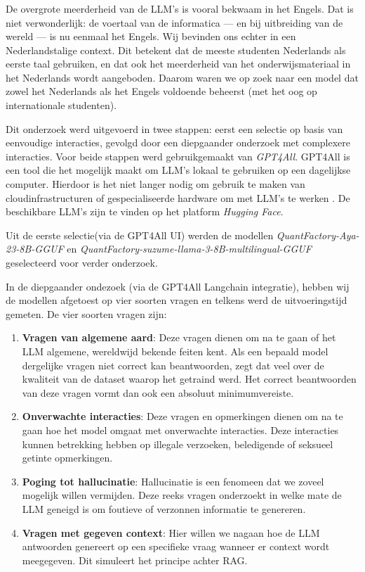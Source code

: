 \subsubsection{}%
\label{subsubsec:LLM-ontdekking}

De overgrote meerderheid van de \acrshort{LLM}'s is vooral bekwaam in het Engels. Dat is niet verwonderlijk: de voertaal van de informatica — en bij uitbreiding van de wereld — is nu eenmaal het Engels. Wij bevinden ons echter in een Nederlandstalige context. Dit betekent dat de meeste studenten Nederlands als eerste taal gebruiken, en dat ook het meerderheid van het onderwijsmateriaal in het Nederlands wordt aangeboden. Daarom waren we op zoek naar een model dat zowel het Nederlands als het Engels voldoende beheerst (met het oog op internationale studenten).

Dit onderzoek werd uitgevoerd in twee stappen: eerst een selectie op basis van eenvoudige interacties, gevolgd door een diepgaander onderzoek met complexere interacties. Voor beide stappen werd gebruikgemaakt van \emph{GPT4All}. GPT4All is een tool die het mogelijk maakt om \acrshort{LLM}'s lokaal te gebruiken op een dagelijkse computer. Hierdoor is het niet langer nodig om gebruik te maken van cloudinfrastructuren of gespecialiseerde hardware om met \acrshort{LLM}'s te werken \autocite{NST2024}. De beschikbare \acrshort{LLM}'s zijn te vinden op het platform \emph{Hugging Face}. 

Uit de eerste selectie(via de GPT4All UI) werden de modellen \emph{QuantFactory-Aya-23-8B-GGUF} en \emph{QuantFactory-suzume-llama-3-8B-multilingual-GGUF} geselecteerd voor verder onderzoek. 

In de diepgaander ondezoek (via de GPT4All Langchain integratie), hebben wij de modellen afgetoest op vier soorten vragen en telkens werd de uitvoeringstijd gemeten. De vier soorten vragen zijn:

\begin{enumerate} 
    \item \textbf{Vragen van algemene aard}: Deze vragen dienen om na te gaan of het LLM algemene, wereldwijd bekende feiten kent. Als een bepaald model dergelijke vragen niet correct kan beantwoorden, zegt dat veel over de kwaliteit van de dataset waarop het getraind werd. Het correct beantwoorden van deze vragen vormt dan ook een absoluut minimumvereiste. 
    \item \textbf{Onverwachte interacties}: Deze vragen en opmerkingen dienen om na te gaan hoe het model omgaat met onverwachte interacties. Deze interacties kunnen betrekking hebben op illegale verzoeken, beledigende of seksueel getinte opmerkingen.
    \item \textbf{Poging tot hallucinatie}: Hallucinatie is een fenomeen dat we zoveel mogelijk willen vermijden. Deze reeks vragen onderzoekt in welke mate de LLM geneigd is om foutieve of verzonnen informatie te genereren.
    \item \textbf{Vragen met gegeven context}: Hier willen we nagaan hoe de LLM antwoorden genereert op een specifieke vraag wanneer er context wordt meegegeven. Dit simuleert het principe achter RAG.
\end{enumerate}

